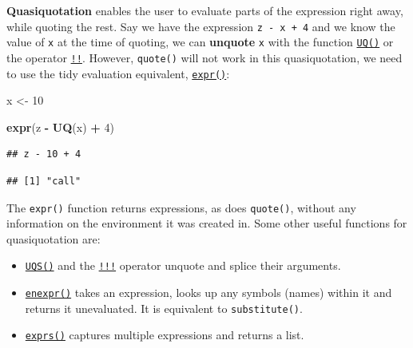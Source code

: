 \documentclass[]{book}
\newenvironment{Shaded}{\begin{snugshade}}{\end{snugshade}}
\newcommand{\DecValTok}[1]{\textcolor[rgb]{0.00,0.00,0.81}{#1}}
\newcommand{\KeywordTok}[1]{\textcolor[rgb]{0.13,0.29,0.53}{\textbf{#1}}}
\newcommand{\NormalTok}[1]{#1}
\newcommand{\OperatorTok}[1]{\textcolor[rgb]{0.81,0.36,0.00}{\textbf{#1}}}
\newcommand{\StringTok}[1]{\textcolor[rgb]{0.31,0.60,0.02}{#1}}
\providecommand{\tightlist}{%
  \setlength{\itemsep}{0pt}\setlength{\parskip}{0pt}}
\begin{document}
\textbf{Quasiquotation} enables the user to evaluate parts of the expression right away, while
quoting the rest. Say we have the expression \texttt{z\ -\ x\ +\ 4} and we know the value of \texttt{x} at
the time of quoting, we can \textbf{unquote} \texttt{x} with the function
\href{http://rlang.tidyverse.org/reference/quasiquotation.html}{\texttt{UQ()}} or the operator
\href{http://rlang.tidyverse.org/reference/quasiquotation.html}{\texttt{!!}}. However, \texttt{quote()}
will not work in this quasiquotation, we need to use the tidy evaluation equivalent,
\href{http://rlang.tidyverse.org/reference/expr.html}{\texttt{expr()}}:

\begin{Shaded}
\begin{Highlighting}[]
\NormalTok{x <-}\StringTok{ }\DecValTok{10}

\KeywordTok{expr}\NormalTok{(z }\OperatorTok{-}\StringTok{ }\KeywordTok{UQ}\NormalTok{(x) }\OperatorTok{+}\StringTok{ }\DecValTok{4}\NormalTok{)}
\end{Highlighting}
\end{Shaded}

\begin{verbatim}
## z - 10 + 4
\end{verbatim}

\begin{Shaded}
\end{Shaded}

\begin{verbatim}
## [1] "call"
\end{verbatim}

The \texttt{expr()} function returns expressions, as does \texttt{quote()}, without any information on
the environment it was created in. Some other useful functions for quasiquotation are:

\begin{itemize}
\tightlist
\item
  \href{http://rlang.tidyverse.org/reference/quasiquotation.html}{\texttt{UQS()}} and the
  \href{http://rlang.tidyverse.org/reference/quasiquotation.html}{\texttt{!!!}} operator unquote and
  splice their arguments.
\item
  \href{http://rlang.tidyverse.org/reference/expr.html}{\texttt{enexpr()}} takes an expression, looks
  up any symbols (names) within it and returns it unevaluated. It is equivalent to
  \texttt{substitute()}.
\item
  \href{http://rlang.tidyverse.org/reference/expr.html}{\texttt{exprs()}} captures multiple
  expressions and returns a list.
\end{itemize}
\end{document}
